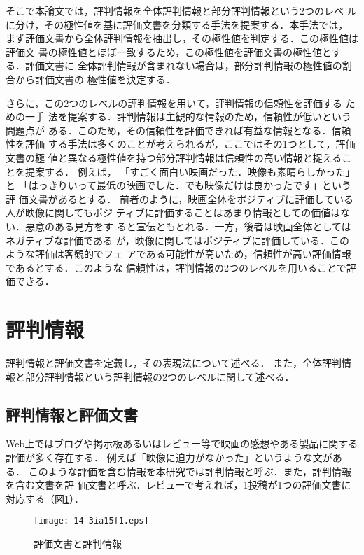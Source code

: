 \documentclass[japanese]{jnlp_1.3c}
\begin{document}
そこで本論文では，評判情報を全体評判情報と部分評判情報という2つのレベ
ルに分け，その極性値を基に評価文書を分類する手法を提案する．本手法では，
まず評価文書から全体評判情報を抽出し，その極性値を判定する．この極性値は評価文
書の極性値とほぼ一致するため，この極性値を評価文書の極性値とする．評価文書に
全体評判情報が含まれない場合は，部分評判情報の極性値の割合から評価文書の
極性値を決定する．


さらに，この2つのレベルの評判情報を用いて，評判情報の信頼性を評価する
ための一手
法を提案する．評判情報は主観的な情報のため，信頼性が低いという問題点が
ある．このため，その信頼性を評価できれば有益な情報となる．信頼性を評価
する手法は多くのことが考えられるが，ここではその1つとして，評価文書の極
値と異なる極性値を持つ部分評判情報は信頼性の高い情報と捉えることを提案する．
例えば，
「すごく面白い映画だった．映像も素晴らしかった」と
「はっきりいって最低の映画でした．でも映像だけは良かったです」という評
価文書があるとする．
前者のように，映画全体をポジティブに評価している人が映像に関してもポジ
ティブに評価することはあまり情報としての価値はない．悪意のある見方をす
ると宣伝ともとれる．一方，後者は映画全体としてはネガティブな評価である
が，映像に関してはポジティブに評価している．このような評価は客観的でフェ
アである可能性が高いため，信頼性が高い評価情報であるとする．このような
信頼性は，評判情報の2つのレベルを用いることで評価できる．



\section{評判情報}
評判情報と評価文書を定義し，その表現法について述べる．
また，全体評判情報と部分評判情報という評判情報の2つのレベルに関して述べる．

\subsection{評判情報と評価文書}

Web上ではブログや掲示板あるいはレビュー等で映画の感想やある製品に関する評価が多く存在する．
例えば「映像に迫力がなかった」というような文がある．
このような評価を含む情報を本研究では評判情報と呼ぶ．また，評判情報を含む文書を評
価文書と呼ぶ．レビューで考えれば，1投稿が1つの評価文書に対応する（図\ref{fig:2.1}）．

\begin{figure}[t]
 \begin{center}
      \texttt{[image: 14-3ia15f1.eps]}
  \caption{評価文書と評判情報}
  \label{fig:2.1}
 \end{center}
\end{figure}
\end{document}
